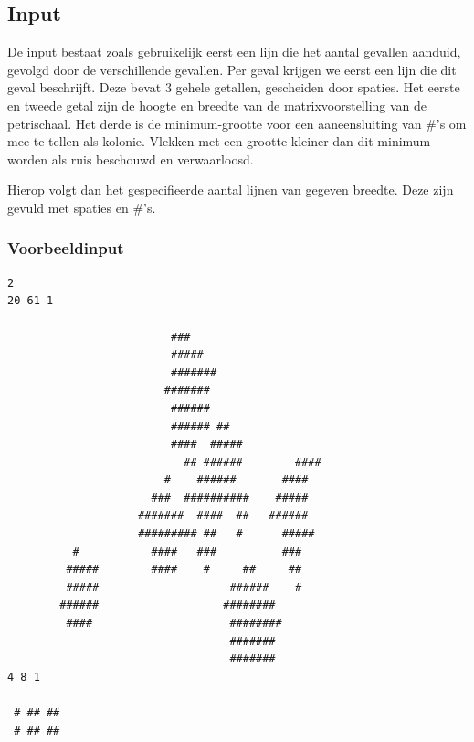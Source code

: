 \subsection*{Input}

De input bestaat zoals gebruikelijk eerst een lijn die het aantal gevallen
aanduid, gevolgd door de verschillende gevallen. Per geval krijgen we eerst een
lijn die dit geval beschrijft. Deze bevat 3 gehele getallen, gescheiden door
spaties. Het eerste en tweede getal zijn de hoogte en breedte van de
matrixvoorstelling van de petrischaal. Het derde is de minimum-grootte voor een
aaneensluiting van \#'s om mee te tellen als kolonie. Vlekken met een grootte
kleiner dan dit minimum worden als ruis beschouwd en verwaarloosd.

Hierop volgt dan het gespecifieerde aantal lijnen van gegeven breedte. Deze zijn
gevuld met spaties en \#'s.

\subsubsection*{Voorbeeldinput}

\begin{verbatim}
2
20 61 1
                                                            
                         ###                                
                         #####                              
                         #######                            
                        #######                             
                         ######                             
                         ###### ##                          
                         ####  #####                        
                           ## ######        ####            
                        #    ######       ####              
                      ###  ##########    #####              
                    #######  ####  ##   ######              
                    ######### ##   #      #####             
          #           ####   ###          ###               
         #####        ####    #     ##     ##               
         #####                    ######    #               
        ######                   ########                   
         ####                     ########                  
                                  #######                   
                                  #######                   
4 8 1
          
 # ## ##  
 # ## ##  
          
\end{verbatim}

